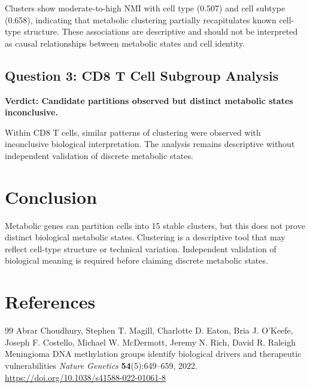 \documentclass[sloppy,11pt]{article}
\begin{document}
Clusters show moderate-to-high NMI with cell type (0.507) and cell subtype (0.658), indicating that metabolic clustering partially recapitulates known cell-type structure. These associations are descriptive and should not be interpreted as causal relationships between metabolic states and cell identity.

\subsection{Question 3: CD8 T Cell Subgroup Analysis}
\textbf{Verdict: Candidate partitions observed but distinct metabolic states inconclusive.}

Within CD8 T cells, similar patterns of clustering were observed with inconclusive biological interpretation. The analysis remains descriptive without independent validation of discrete metabolic states.

\section{Conclusion}
Metabolic genes can partition cells into 15 stable clusters, but this does not prove distinct biological metabolic states. Clustering is a descriptive tool that may reflect cell-type structure or technical variation. Independent validation of biological meaning is required before claiming discrete metabolic states.

\section{References}
\begin{thebibliography}{99}
Abrar Choudhury, Stephen T. Magill, Charlotte D. Eaton, Bria J. O'Keefe, Joseph F. Costello, Michael W. McDermott, Jeremy N. Rich, David R. Raleigh
\newblock Meningioma DNA methylation groups identify biological drivers and therapeutic vulnerabilities
\newblock \textit{Nature Genetics} \textbf{54}(5):649--659, 2022.
\newblock \url{https://doi.org/10.1038/s41588-022-01061-8}
\end{thebibliography}
\end{document}
